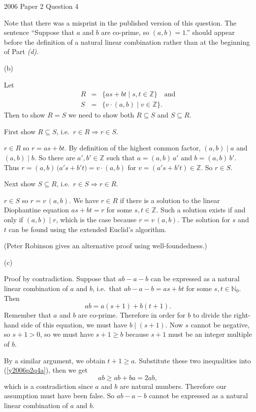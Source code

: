 \documentclass{article}
\begin{document}
2006 Paper 2 Question 4

Note that there was a misprint in the published version of this question. 
The sentence ``Suppose that $a$ and $b$ are co-prime, so $(a,b)=1$.'' should
appear before the definition of a natural linear combination rather than
at the beginning of Part \emph{(d)}.

(b)

Let
\begin{eqnarray*}
R &=& \{as + bt \;|\; s,t \in \mathbb{Z}\} \quad \mbox{and}\\
S &=& \{v \cdot (a,b) \;|\; v \in \mathbb{Z}\}.
\end{eqnarray*}
Then to show $R=S$ we need to show both $R \subseteq S$ and $S \subseteq R$.

First show $R \subseteq S$, i.e.\ $r \in R \Rightarrow r \in S$.

$r \in R$ so $r = as + bt$. By definition of the highest common factor,
$(a,b) \;|\; a$ and $(a,b) \;|\; b$.  So there are $a',b' \in \mathbb{Z}$
such that $a=(a,b)\,a'$ and $b=(a,b)\,b'$.
Thus $r = (a,b)\,\big(a's + b't\big) = v\cdot(a,b)$ for
$v = (a's + b't) \in \mathbb{Z}$. So $r \in S$.

Next show $S \subseteq R$, i.e.\ $r \in S \Rightarrow r \in R$.

$r \in S$ so $r = v\,(a,b)$. We have $r \in R$ if there is a solution to the
linear Diophantine equation $as + bt = r$ for some $s,t \in \mathbb{Z}$.
Such a solution exists if and only if $(a,b) \;|\; r$, which is the case
because $r = v\,(a,b)$. The solution for $s$ and $t$ can be found using the
extended Euclid's algorithm.

(Peter Robinson gives an alternative proof using well-foundedness.)

(c)

Proof by contradiction. Suppose that $ab-a-b$ can be expressed as a natural
linear combination of $a$ and $b$, i.e.\ that $ab-a-b = as+bt$ for some
$s,t \in \mathbb{N}_0$. Then
\begin{equation}\label{y2006p2q4a}
ab=a(s+1) + b(t+1).
\end{equation}
Remember that $a$ and $b$ are co-prime. Therefore in order for $b$ to divide
the right-hand side of this equation, we must have $b \;|\; (s+1)$. Now $s$
cannot be negative, so $s+1>0$, so we must have $s+1 \ge b$ because $s+1$
must be an integer multiple of $b$.

By a similar argument, we obtain $t+1 \ge a$. Substitute these two inequalities
into (\ref{y2006p2q4a}), then we get
$$ab \ge ab + ba = 2ab,$$
which is a contradiction since $a$ and $b$ are natural numbers. Therefore our
assumption must have been false. So $ab-a-b$ cannot be expressed as a natural
linear combination of $a$ and $b$.
\end{document}
